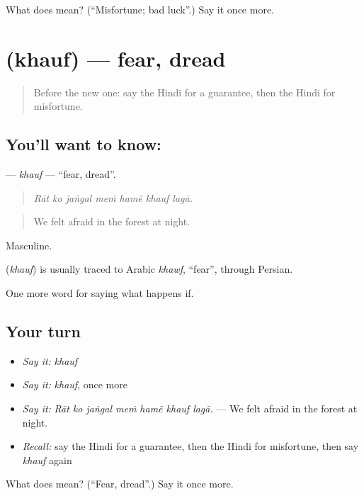 \begin{tcolorbox}[breakable,colback=teal!4,colframe=teal!35!black,title={Before you move on}]
What does  mean? (\textquotedblleft{}Misfortune; bad luck\textquotedblright{}.) Say it once more.
\end{tcolorbox}
\section[\texorpdfstring{\hi{ख़ौफ़} (khauf)}{ख़ौफ़ (khauf)}]{ (khauf) — fear, dread}

\label{lesson:HI-C557-khauf}



\begin{quote}
Before the new one: say the Hindi for a guarantee, then the Hindi for misfortune.
\end{quote}

\subsection*{You'll want to know: }
\textbf{} — \emph{khauf} — \textquotedblleft{}fear, dread\textquotedblright{}.

\begin{quote}
      
\end{quote}

\begin{quote}
\emph{Rāt ko jaṅgal meṁ hamẽ khauf lagā.}
\end{quote}

\begin{quote}
We felt afraid in the forest at night.
\end{quote}

Masculine.

\begin{cousinweb}
\textbf{} (\emph{khauf}) is usually traced to Arabic \emph{khawf}, \textquotedblleft{}fear\textquotedblright{}, through Persian.
\end{cousinweb}

\begin{grammarlens}[title={What you've built}]
One more word for saying what happens if.
\end{grammarlens}

\subsection*{Your turn}
\begin{itemize}
\raggedright
  \item \emph{Say it:} \emph{khauf}
  \item \emph{Say it:} \emph{khauf}, once more
  \item \emph{Say it:} \emph{Rāt ko jaṅgal meṁ hamẽ khauf lagā.} — We felt afraid in the forest at night.
  \item \emph{Recall:} say the Hindi for a guarantee, then the Hindi for misfortune, then say \emph{khauf} again
\end{itemize}

\begin{tcolorbox}[breakable,colback=teal!4,colframe=teal!35!black,title={Before you move on}]
What does  mean? (\textquotedblleft{}Fear, dread\textquotedblright{}.) Say it once more.
\end{tcolorbox}
